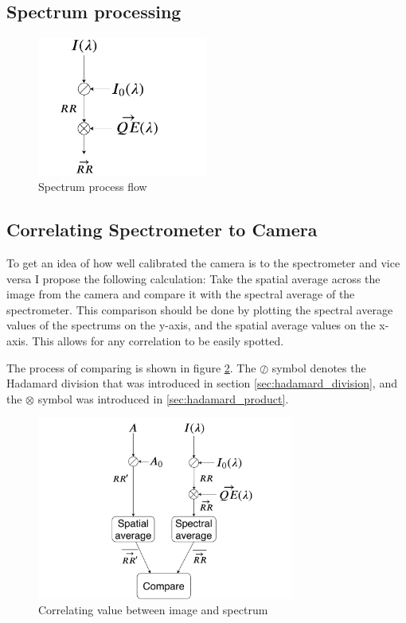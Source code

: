 \subsection{Spectrum processing}
\label{sec:spectrum_processing}

\begin{figure}[h]
    \centering
    \includegraphics[width=0.5\textwidth]{figures/thesis_program_flow.pdf}
    \caption{Spectrum process flow}
    \label{fig:spectrum_process_flow}
\end{figure}

\subsection{Correlating Spectrometer to Camera}
\label{sec:method_correlating_spectrum_to_camera}
To get an idea of how well calibrated the camera is to the spectrometer and vice versa I propose the following calculation: 
Take the spatial average across the image from the camera and compare it with the spectral average of the spectrometer. This comparison should be done by plotting the spectral average values of the spectrums on the y-axis, and the spatial average values on the x-axis. This allows for any correlation to be easily spotted. 

The process of comparing is shown in figure \ref{fig:correlating_spectrum_and_image}. The $\oslash$ symbol denotes the Hadamard division that was introduced in section \ref{sec:hadamard_division}, and the $\otimes$ symbol was introduced in \ref{sec:hadamard_product}. 

\begin{figure}[h]
    \centering
    \includegraphics[width=0.75\textwidth]{figures/image_comparison_with_spectrometer.pdf}
    \caption{Correlating value between image and spectrum}
    \label{fig:correlating_spectrum_and_image}
\end{figure}


